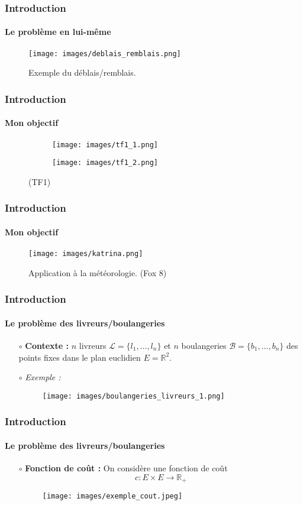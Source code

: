 \documentclass{beamer}
\begin{document}
\begin{frame}
	\frametitle{Introduction}
    \framesubtitle{Le problème en lui-même}
	\begin{figure}
		\centering 
		\texttt{[image: images/deblais\_remblais.png]}
		\caption{Exemple du déblais/remblais.}
	\end{figure}
\end{frame}
\begin{frame}
	\frametitle{Introduction} 
	\framesubtitle{Mon objectif}
	\begin{figure}[h!]
		\centering 
		\begin{subfigure}{0.4\textwidth}
			\centering 
			\texttt{[image: images/tf1\_1.png]}
			\caption{}
		\end{subfigure}
		\hspace*{\fill}
		\begin{subfigure}{0.4\textwidth}
			\centering 
			\texttt{[image: images/tf1\_2.png]}
			\caption{}
		\end{subfigure}
		\caption{(TF1)}
	\end{figure}
\end{frame}
\begin{frame}
	\frametitle{Introduction}
    \framesubtitle{Mon objectif}
	\begin{figure}
		\centering 
		\texttt{[image: images/katrina.png]}
		\caption{Application à la météorologie. (Fox 8)}
	\end{figure}
\end{frame}
\begin{frame}
	\frametitle{Introduction}
	\framesubtitle{Le problème des livreurs/boulangeries} 

		\begin{itemize}
			\item[$\circ$] \textbf{Contexte :} $n$ livreurs $ \mathcal{L} = \{ l_1,\ldots,l_n \}$ et $n$ boulangeries $ \mathcal{B} = \{ b_1,\ldots, b_n \}$ des points fixes dans le plan euclidien $E = \mathbb{R}^2$.
			\item[$\circ$] \textit{Exemple :} \begin{figure}
				\centering 
				\texttt{[image: images/boulangeries\_livreurs\_1.png]}
			\end{figure}
		\end{itemize}



\end{frame}
\begin{frame}
	\frametitle{Introduction}
	\framesubtitle{Le problème des livreurs/boulangeries} 
	
		\begin{itemize}
			\item[$\circ$] \textbf{Fonction de coût :} On considère une fonction de coût  \[c : E \times E \to \mathbb{R}_+\]
			\begin{figure}[h!]
				\centering 
				\texttt{[image: images/exemple\_cout.jpeg]}
			\end{figure}
		
			
		\end{itemize}
	

\end{frame}
\end{document}
